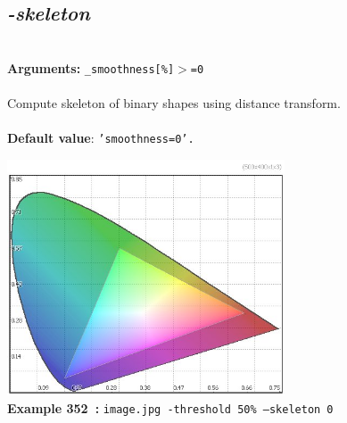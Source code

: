 \documentclass[a4paper,11pt,twoside]{book}
\begin{document}
\subsection{\emph{-skeleton} }\vspace*{-0.5em}
~\\\textbf{Arguments: } 
{\small \texttt{\_smoothness[\%]$>$=0}}\\~\\
Compute skeleton of binary shapes using distance transform.
~\\~\\\textbf{Default value}: {\small \texttt{'smoothness=0'.}}
\begin{center}\includegraphics[keepaspectratio=true,height=7cm,width=\textwidth]{img/gmic_def352.jpg}\\
{\footnotesize \textbf{Example 352~:} \texttt{image.jpg -threshold 50\% --skeleton 0}}
\end{center}
\end{document}
